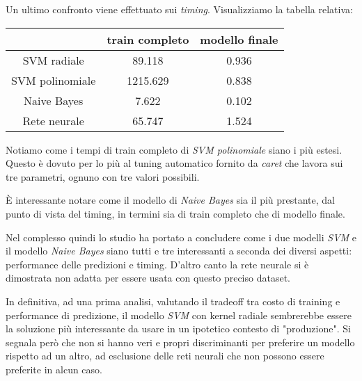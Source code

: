 Un ultimo confronto viene effettuato sui \textit{timing}. Visualizziamo la 
tabella relativa:
\begin{table}[H]
    \centering
    \begin{tabular}{|c|c|c|}
        \hline
        & train completo & modello finale\\
        \hline
        SVM radiale & 89.118 & 0.936 \\
        SVM polinomiale & 1215.629 & 0.838 \\
        Naive Bayes & 7.622 & 0.102\\
        Rete neurale & 65.747 & 1.524\\
        \hline
    \end{tabular}
\end{table}
Notiamo come i tempi di train completo di \textit{SVM polinomiale} siano i più 
estesi. Questo è dovuto per lo più al tuning automatico fornito da 
\textit{caret} che lavora sui tre parametri, ognuno con tre valori 
possibili.

È interessante notare come il modello di \textit{Naive Bayes} sia il più 
prestante, dal punto di vista del timing, in termini sia di train completo che 
di modello finale.

Nel complesso quindi lo studio ha portato a concludere come i due modelli 
\textit{SVM} e il modello \textit{Naive Bayes} siano tutti e tre interessanti
a seconda dei diversi aspetti: performance delle predizioni e timing. D'altro
canto la rete neurale si è dimostrata non adatta per essere usata con questo
preciso dataset.

In definitiva, ad una prima analisi, valutando il tradeoff tra costo di training
e performance di predizione, il modello \textit{SVM} con kernel radiale 
sembrerebbe essere la soluzione più interessante da usare in un ipotetico
contesto di "produzione". Si segnala però che non si hanno veri e propri
discriminanti per preferire un modello rispetto ad un altro, ad esclusione delle
reti neurali che non possono essere preferite in alcun caso.